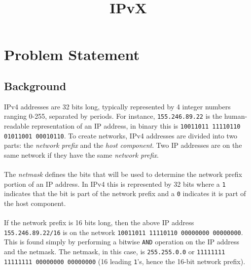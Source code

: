 \documentclass[11pt]{article}
\title{\textbf{IPvX}}
\date{}
\begin{document}
\pagestyle{fancy}


\section{Problem Statement}

\subsection{Background}
IPv4 addresses are 32 bits long, typically represented by 4 integer numbers ranging 0-255, separated by periods. For instance, \texttt{155.246.89.22} is the human-readable representation of an IP address, in binary this is \texttt{10011011 11110110 01011001 00010110}. To create networks, IPv4 addresses are divided into two parts: the \emph{network prefix} and the \emph{host component}. Two IP addresses are on the same network if they have the same \emph{network prefix}.
\\\\
The \emph{netmask} defines the bits that will be used to determine the network prefix portion of an IP address. In IPv4 this is represented by 32 bits where a \texttt{1} indicates that the bit is part of the network prefix and a \texttt{0} indicates it is part of the host component.
\\\\
If the network prefix is 16 bits long, then the above IP address \texttt{155.246.89.22/16} is on the network \texttt{10011011 11110110 00000000 00000000}. This is found simply by performing a bitwise \texttt{AND} operation on the IP address and the netmask. The netmask, in this case, is \texttt{255.255.0.0} or 
\texttt{11111111 11111111 00000000 00000000} (16 leading \texttt{1}'s, hence the 16-bit network prefix).
\end{document}
